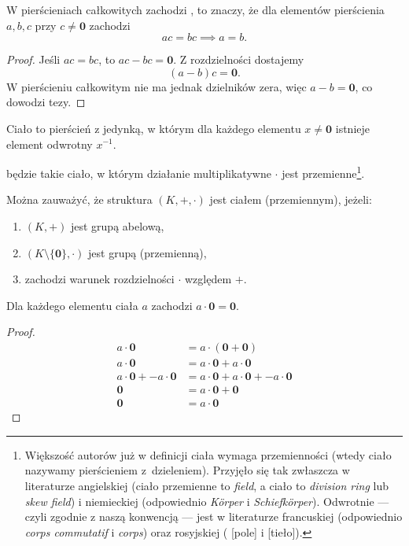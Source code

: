 \begin{lemma}
    \label{l:cancellation_property}
    W pierścieniach całkowitych zachodzi , to znaczy, że dla elementów pierścienia $a, b, c$ przy $c \neq \mathbf{0}$ zachodzi
    \[ ac = bc \implies a = b. \]
\end{lemma}
\begin{proof}
    Jeśli $ac = bc$, to $ac - bc = \mathbf{0}$. Z rozdzielności dostajemy
    \[ (a - b)c = \mathbf{0}. \]
    W pierścieniu całkowitym nie ma jednak dzielników zera, więc $a - b = \mathbf{0}$, co dowodzi tezy.
\end{proof}

\begin{definition}
    Ciało to pierścień z jedynką, w którym dla każdego elementu $x \neq \mathbf{0}$ istnieje element odwrotny $x^{-1}$.
\end{definition}

 będzie takie ciało, w którym działanie multiplikatywne $\cdot$ jest przemienne\footnote{Większość autorów już w definicji ciała wymaga przemienności (wtedy ciało nazywamy pierścieniem z~dzieleniem). Przyjęło się tak zwłaszcza w literaturze angielskiej (ciało przemienne to \textit{field}, a ciało to \textit{division ring} lub \textit{skew field}) i niemieckiej (odpowiednio \textit{Körper} i \textit{Schiefkörper}). Odwrotnie --- czyli zgodnie z naszą konwencją --- jest w literaturze francuskiej (odpowiednio \textit{corps commutatif} i \textit{corps}) oraz rosyjskiej ( [pole] i  [tieło]).}.

Można zauważyć, że struktura $(K, +, \cdot)$ jest ciałem (przemiennym), jeżeli:
\begin{enumerate}
    \item $(K, +)$ jest grupą abelową,
    \item $(K \setminus \{\mathbf{0}\}, \cdot)$ jest grupą (przemienną),
    \item zachodzi warunek rozdzielności $\cdot$ względem $+$.
\end{enumerate}

\begin{lemma}
    \label{l:a0=0}
    Dla każdego elementu ciała $a$ zachodzi $a \cdot \mathbf{0} = \mathbf{0}$.
\end{lemma}
\begin{proof}
    \begin{align*}             a \cdot \mathbf{0} &= a \cdot (\mathbf{0} + \mathbf{0}) \\
                               a \cdot \mathbf{0} &= a \cdot \mathbf{0} + a \cdot \mathbf{0} \\
        a \cdot \mathbf{0} + - a \cdot \mathbf{0} &= a \cdot \mathbf{0} + a \cdot \mathbf{0} + - a \cdot \mathbf{0} \\
                                       \mathbf{0} &= a \cdot \mathbf{0} + \mathbf{0} \\
                                       \mathbf{0} &= a \cdot \mathbf{0}
    \end{align*}
\end{proof}

